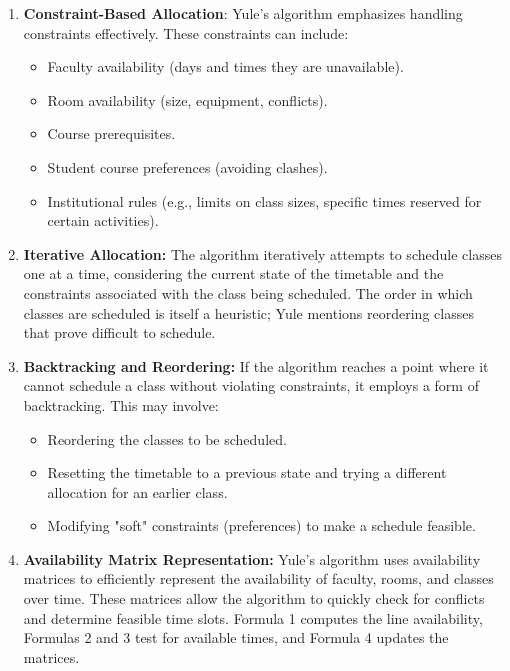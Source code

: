 \begin{enumerate}[label=\alph*.]
    \item \textbf{Constraint-Based Allocation}: Yule's algorithm emphasizes handling constraints effectively.
	These constraints can include:
    \begin{itemize}
        \item Faculty availability (days and times they are unavailable).
        \item Room availability (size, equipment, conflicts).
        \item Course prerequisites.
        \item Student course preferences (avoiding clashes).
        \item Institutional rules (e.g., limits on class sizes, specific times reserved for certain activities).
    \end{itemize}

    \item \textbf{Iterative Allocation:} The algorithm iteratively attempts to schedule classes one at a time, considering the current state of the timetable and the constraints associated with the class being scheduled.
	The order in which classes are scheduled is itself a heuristic; Yule mentions reordering classes that prove difficult to schedule.

    \item \textbf{Backtracking and Reordering:} If the algorithm reaches a point where it cannot schedule a class without violating constraints, it employs a form of backtracking.
	This may involve:
    \begin{itemize}
        \item Reordering the classes to be scheduled.
        \item Resetting the timetable to a previous state and trying a different allocation for an earlier class.
        \item Modifying "soft" constraints (preferences) to make a schedule feasible.
    \end{itemize}

    \item \textbf{Availability Matrix Representation:} Yule's algorithm uses availability matrices to efficiently represent the availability of faculty, rooms, and classes over time.
	These matrices allow the algorithm to quickly check for conflicts and determine feasible time slots.
	Formula 1 computes the line availability, Formulas 2 and 3 test for available times, and Formula 4 updates the matrices.


\end{enumerate}
